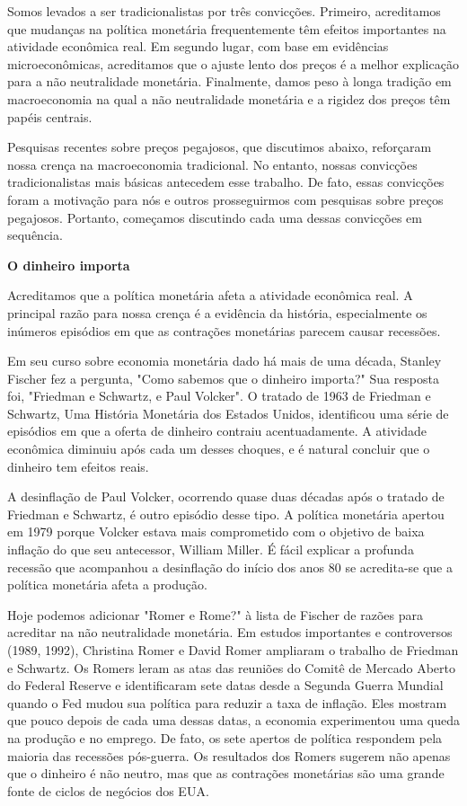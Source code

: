 \documentclass[a4paper,12pt]{article}[abntex2]
\begin{document}
Somos levados a ser tradicionalistas por três convicções. Primeiro, acreditamos que mudanças na política monetária frequentemente têm efeitos importantes na atividade econômica real. Em segundo lugar, com base em evidências microeconômicas, acreditamos que o ajuste lento dos preços é a melhor explicação para a não neutralidade monetária. Finalmente, damos peso à longa tradição em macroeconomia na qual a não neutralidade monetária e a rigidez dos preços têm papéis centrais.

Pesquisas recentes sobre preços pegajosos, que discutimos abaixo, reforçaram nossa crença na macroeconomia tradicional. No entanto, nossas convicções tradicionalistas mais básicas antecedem esse trabalho. De fato, essas convicções foram a motivação para nós e outros prosseguirmos com pesquisas sobre preços pegajosos. Portanto, começamos discutindo cada uma dessas convicções em sequência.

\textbf{O dinheiro importa}

Acreditamos que a política monetária afeta a atividade econômica real. A principal razão para nossa crença é a evidência da história, especialmente os inúmeros episódios em que as contrações monetárias parecem causar recessões.

Em seu curso sobre economia monetária dado há mais de uma década, Stanley Fischer fez a pergunta, "Como sabemos que o dinheiro importa?" Sua resposta foi, "Friedman e Schwartz, e Paul Volcker". O tratado de 1963 de Friedman e Schwartz, Uma História Monetária dos Estados Unidos, identificou uma série de episódios em que a oferta de dinheiro contraiu acentuadamente. A atividade econômica diminuiu após cada um desses choques, e é natural concluir que o dinheiro tem efeitos reais.

A desinflação de Paul Volcker, ocorrendo quase duas décadas após o tratado de Friedman e Schwartz, é outro episódio desse tipo. A política monetária apertou em 1979 porque Volcker estava mais comprometido com o objetivo de baixa inflação do que seu antecessor, William Miller. É fácil explicar a profunda recessão que acompanhou a desinflação do início dos anos 80 se acredita-se que a política monetária afeta a produção.

Hoje podemos adicionar "Romer e Rome?" à lista de Fischer de razões para acreditar na não neutralidade monetária. Em estudos importantes e controversos (1989, 1992), Christina Romer e David Romer ampliaram o trabalho de Friedman e Schwartz. Os Romers leram as atas das reuniões do Comitê de Mercado Aberto do Federal Reserve e identificaram sete datas desde a Segunda Guerra Mundial quando o Fed mudou sua política para reduzir a taxa de inflação. Eles mostram que pouco depois de cada uma dessas datas, a economia experimentou uma queda na produção e no emprego. De fato, os sete apertos de política respondem pela maioria das recessões pós-guerra. Os resultados dos Romers sugerem não apenas que o dinheiro é não neutro, mas que as contrações monetárias são uma grande fonte de ciclos de negócios dos EUA.
\end{document}
